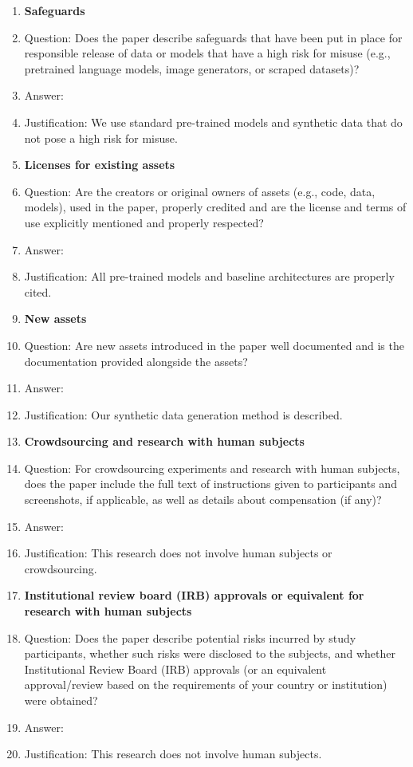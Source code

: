 \begin{enumerate}
\item {\bf Safeguards}
    \item[] Question: Does the paper describe safeguards that have been put in place for responsible release of data or models that have a high risk for misuse (e.g., pretrained language models, image generators, or scraped datasets)?
    \item[] Answer: \answerNA{}
    \item[] Justification: We use standard pre-trained models and synthetic data that do not pose a high risk for misuse.

\item {\bf Licenses for existing assets}
    \item[] Question: Are the creators or original owners of assets (e.g., code, data, models), used in the paper, properly credited and are the license and terms of use explicitly mentioned and properly respected?
    \item[] Answer: \answerYes{}
    \item[] Justification: All pre-trained models and baseline architectures are properly cited.

\item {\bf New assets}
    \item[] Question: Are new assets introduced in the paper well documented and is the documentation provided alongside the assets?
    \item[] Answer: \answerYes{}
    \item[] Justification: Our synthetic data generation method is described.

\item {\bf Crowdsourcing and research with human subjects}
    \item[] Question: For crowdsourcing experiments and research with human subjects, does the paper include the full text of instructions given to participants and screenshots, if applicable, as well as details about compensation (if any)? 
    \item[] Answer: \answerNA{}
    \item[] Justification: This research does not involve human subjects or crowdsourcing.

\item {\bf Institutional review board (IRB) approvals or equivalent for research with human subjects}
    \item[] Question: Does the paper describe potential risks incurred by study participants, whether such risks were disclosed to the subjects, and whether Institutional Review Board (IRB) approvals (or an equivalent approval/review based on the requirements of your country or institution) were obtained?
    \item[] Answer: \answerNA{}
    \item[] Justification: This research does not involve human subjects.


\end{enumerate}
